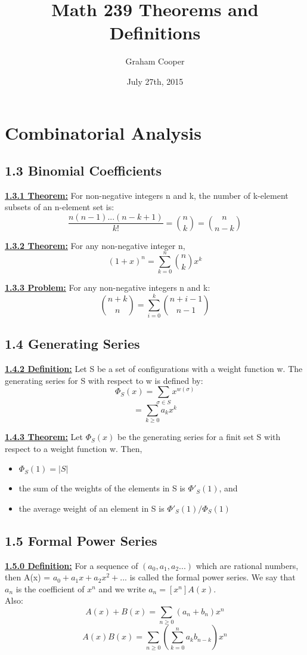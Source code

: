 \documentclass[12pt]{article}
\title{\vspace{-15ex}Math 239 Theorems and Definitions\vspace{-1ex}}
\date{July 27th, 2015}
\author{Graham Cooper}
\newcommand{\myt}[1]{\textbf{\underline{#1}}}
\begin{document}
	\maketitle
	
	\section{Combinatorial Analysis}
	
	\subsection*{1.3 Binomial Coefficients}
	\myt{1.3.1 Theorem:} For non-negative integers n and k, the number of k-element subsets of an n-element set is:\\
	$$\frac{n(n-1)...(n-k+1)}{k!} = {n \choose k} = {n \choose n - k}$$
	
	\myt{1.3.2 Theorem:} For any non-negative integer n,\\
	$$(1+x)^n = \sum_{k=0}^{n}{n \choose k}x^k$$
	
	\myt{1.3.3 Problem:} For any non-negative integers n and k:\\
	$${n + k \choose n} = \sum_{i = 0}^{k}{n + i - 1 \choose n - 1}$$
	
	\subsection*{1.4 Generating Series}
	
	\myt{1.4.2 Definition:} Let S be a set of configurations with a weight function w. The generating series for S with respect to w is defined by:\\
	$$\Phi_S(x) = \sum_{\sigma \in S}x^{w(\sigma)}$$
	$$ = \sum_{k\geq 0}a_kx^k$$
	
	\myt{1.4.3 Theorem:} Let $\Phi_S(x)$ be the generating series for a finit set S with respect to a weight function w. Then,\\
	\begin{itemize}
		\item $\Phi_S(1) = |S|$
		\item the sum of the weights of the elements in S is $\Phi'_S(1)$, and
		\item the average weight of an element in S is $\Phi'_S(1)/\Phi_S(1)$
	\end{itemize}
	
	\subsection*{1.5 Formal Power Series}
	\myt{1.5.0 Definition:} For a sequence of $(a_0, a_1, a_2...)$ which are rational numbers, then A(x) = $a_0 + a_1x+a_2x^2 + ...$ is called the formal power series. We say that $a_n$ is the coefficient of $x^n$ and we write $a_n = [x^n]A(x)$.\\
	Also:\\
	$$A(x) + B(x) = \sum_{n \geq 0}(a_n + b_n)x^n$$
	$$A(x)B(x) = \sum_{n \geq 0}(\sum_{k=0}^{n}a_kb_{n-k})x^n$$
	
\end{document}
